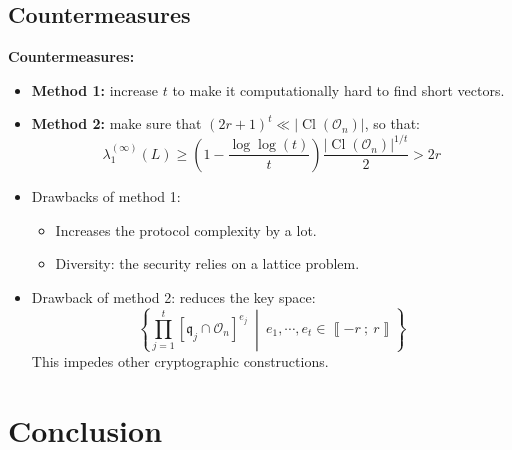 \documentclass[10pt]{beamer}
\theoremstyle{plain}
\theoremstyle{definition}
\newcommand{\mO}{\mathcal{O}}
\renewcommand{\i}[2]{\left\llbracket #1~;~#2\right\rrbracket}
\renewcommand{\(}{\left(}
\renewcommand{\)}{\right)}
\newcommand{\mf}[1]{\mathfrak{#1}}
\DeclareMathOperator{\Cl}{Cl}
\begin{document}
\subsection{Countermeasures}

\begin{frame}
\textbf{Countermeasures:}

\vspace{0.5cm}
\begin{itemize}
\item \textbf{Method 1:} increase $t$ to make it computationally hard to find short vectors.

\item \textbf{Method 2:} make sure that $(2r+1)^t\ll |\Cl(\mO_n)|$, so that:
\[ \lambda_1^{(\infty)}(L)\geq \(1-\frac{\log\log(t)}{t}\)\frac{|\Cl(\mO_n)|^{1/t}}{2}> 2r\]
\pause 
\item Drawbacks of method 1:
\begin{itemize}
\item Increases the protocol complexity by a lot.
\item Diversity: the security relies on a lattice problem.
\end{itemize}
\pause
\item Drawback of method 2: reduces the key space:
\[\left\{\prod_{j=1}^t [\mf{q}_j\cap\mO_n]^{e_j} \ \middle| \ e_1,\cdots, e_t\in\i{-r}{r} \right\}\]
This impedes other cryptographic constructions.
\end{itemize}
\end{frame}

\section{Conclusion}
\end{document}
